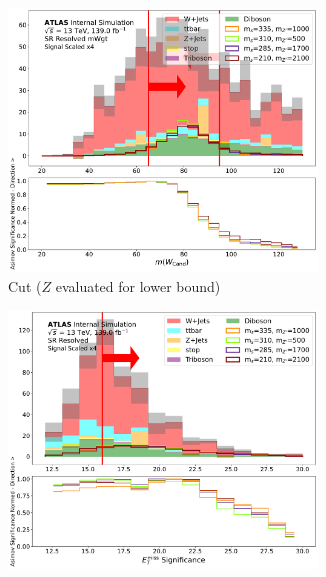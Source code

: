 \begin{figure}[htbp]
\begin{subfigure}[t]{0.48\textwidth}
    \centering
     \includegraphics[width = 0.9\textwidth]{Figures/5/SR1L_Resolved_mWgt/WCand_m_normSig_N_1.pdf}
     \caption{\Wcandm Cut (\(Z\) evaluated for lower bound)}
    \end{subfigure}
    \begin{subfigure}[t]{0.48\textwidth}
    \centering
     \includegraphics[width = 0.9\textwidth]{Figures/5/SR1L_Resolved/MetTST_Significance_normSig_N_1.pdf}
    \caption{\metsig}
    \end{subfigure}
    \begin{subfigure}[t]{0.48\textwidth}
    \centering

\end{subfigure}
\end{figure}
